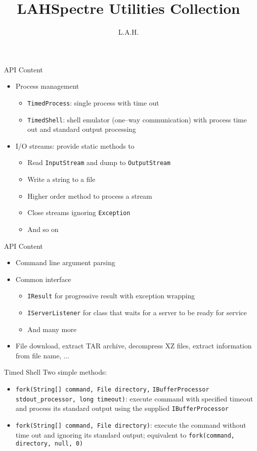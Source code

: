 \documentclass{beamer}
\title{LAHSpectre Utilities Collection}
\author{L.A.H.}
\begin{document}
\begin{frame}
\titlepage
\end{frame}

\begin{frame}[fragile]{API Content}
\begin{itemize}
\item Process management
\begin{itemize}
\item \verb/TimedProcess/: single process with time out
\item \verb/TimedShell/: shell emulator (one--way communication) with process time out and standard output processing
\end{itemize}
\item I/O streams: provide static methods to
\begin{itemize}
\item Read \verb/InputStream/ and dump to \verb/OutputStream/
\item Write a string to a file
\item Higher order method to process a stream
\item Close streams ignoring \verb/Exception/
\item And so on
\end{itemize}
\end{itemize}
\end{frame}

\begin{frame}[fragile]{API Content}
\begin{itemize}
\item Command line argument parsing
\item Common interface
\begin{itemize}
\item \verb/IResult/ for progressive result with exception wrapping 
\item \verb/IServerListener/ for class that waits for a server to be ready for service
\item And many more
\end{itemize}
\item File download, extract TAR archive, decompress XZ files, extract information from file name, ...
\end{itemize}
\end{frame}

\begin{frame}[fragile]{Timed Shell}
Two simple methods:
\begin{itemize}
\item \verb/fork(String[] command, File directory,/ \verb/IBufferProcessor stdout_processor, long timeout)/: execute command with specified timeout and process its standard output using the supplied \verb/IBufferProcessor/
\item \verb/fork(String[] command, File directory)/: execute the command without time out and ignoring its standard output; equivalent to \verb/fork(command, directory, null, 0)/
\end{itemize}
\end{frame}
\end{document}

